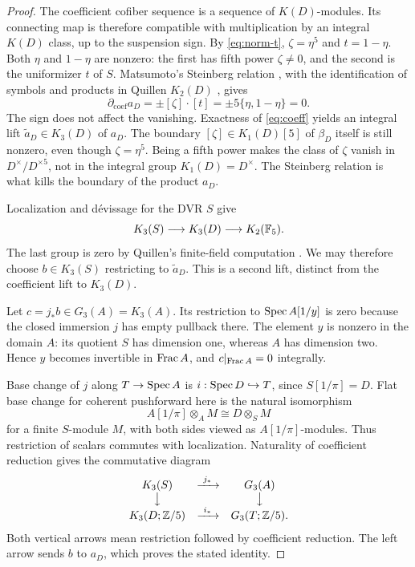 \begin{proof}
The coefficient cofiber sequence is a sequence of $K(D)$-modules.
Its connecting map is therefore compatible with multiplication by
an integral $K(D)$ class, up to the suspension sign. By \eqref{eq:norm-t},
$\zeta=\eta^5$ and $t=1-\eta$. Both $\eta$ and $1-\eta$
are nonzero: the first has fifth power $\zeta\ne0$, and
the second is the uniformizer $t$ of $S$. Matsumoto's
Steinberg relation \cite[\S5, Lemma 5.6, Theorem 5.10, and
Corollary 5.11]{Matsumoto}, with the identification of symbols and
products in Quillen $K_2(D)$
\cite[III.6.1, IV.1.7.1, IV.1.10.1, and IV.7.2]{Weibel}, gives
\begin{equation}\label{eq:steinberg}
 \partial_{\mathrm{coef}}a_D
 =\pm[\zeta]\cdot[t]
 =\pm5\{\eta,1-\eta\}=0.
\end{equation}
The sign does not affect the vanishing. Exactness of
\eqref{eq:coeff} yields an integral lift
$\widetilde a_D\in K_3(D)$ of $a_D$.
The boundary $[\zeta]\in K_1(D)[5]$ of $\beta_D$ itself is
still nonzero, even though $\zeta=\eta^5$. Being a fifth power
makes the class of $\zeta$ vanish in $D^\times/D^{\times5}$,
not in the integral group $K_1(D)=D^\times$.
The Steinberg relation is what kills the boundary of the product
$a_D$.

Localization and d\'evissage for the DVR $S$ give
\cite[\S7, Proposition 3.2]{QuillenHigher}
\[
 K_3(S)\longrightarrow K_3(D)\longrightarrow K_2(\mathbb F_5).
\]
The last group is zero by Quillen's finite-field computation
\cite{QuillenFinite}. We may therefore choose
$b\in K_3(S)$ restricting to $\widetilde a_D$. This is a
second lift, distinct from the coefficient lift to $K_3(D)$.

Let $c=j_*b\in G_3(A)=K_3(A)$. Its restriction to
$\operatorname{Spec} A[1/y]$ is zero because the closed immersion $j$
has empty pullback there. The element $y$ is nonzero in the
domain $A$: its quotient $S$ has dimension one, whereas $A$
has dimension two. Hence $y$ becomes invertible in $\operatorname{Frac} A$,
and $c|_{\operatorname{Frac} A}=0$ integrally.

Base change of $j$ along $T\to\operatorname{Spec} A$ is
$i:\operatorname{Spec} D\hookrightarrow T$, since $S[1/\pi]=D$.
Flat base change for coherent pushforward
\cite[V.3.7.2]{Weibel} here is the natural isomorphism
\[
 A[1/\pi]\otimes_A M\cong D\otimes_S M
\]
for a finite $S$-module $M$, with both sides viewed as
$A[1/\pi]$-modules. Thus restriction of scalars commutes with
localization. Naturality of coefficient reduction gives the
commutative diagram
\[
\begin{array}{ccc}
 K_3(S)&\xrightarrow{\ j_*\ }&G_3(A)\\
 \big\downarrow&&\big\downarrow\\
 K_3(D;\mathbb Z/5)&\xrightarrow{\ i_*\ }&G_3(T;\mathbb Z/5).
\end{array}
\]
Both vertical arrows mean restriction followed by coefficient
reduction. The left arrow sends $b$ to $a_D$,
which proves the stated identity.
\end{proof}

